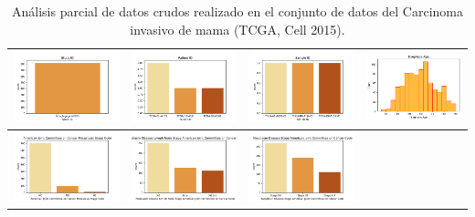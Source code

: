 \newpage
\begin{table}
	\begin{center} 
		\caption{Análisis parcial de datos crudos realizado en el conjunto de datos del Carcinoma invasivo de mama (TCGA, Cell 2015).}
		\label{datos_crudos}
		\begin{tabular}{ |c|c|c|c| }
			\hline 
			\includegraphics[width=.22\textwidth]{NOTEBOOK/IMAGENES_CRUDAS/1} 
			& \includegraphics[width=.25\textwidth]{NOTEBOOK/IMAGENES_CRUDAS/2} 
			& \includegraphics[width=.25\textwidth]{NOTEBOOK/IMAGENES_CRUDAS/3}
			& \includegraphics[width=.25\textwidth]{NOTEBOOK/IMAGENES_CRUDAS/4} 
			\\  \hline 
			\includegraphics[width=.25\textwidth]{NOTEBOOK/IMAGENES_CRUDAS/5} 
			& \includegraphics[width=.25\textwidth]{NOTEBOOK/IMAGENES_CRUDAS/6} 
			& \includegraphics[width=.25\textwidth]{NOTEBOOK/IMAGENES_CRUDAS/7} 

\end{tabular}
\end{center}
\end{table}
